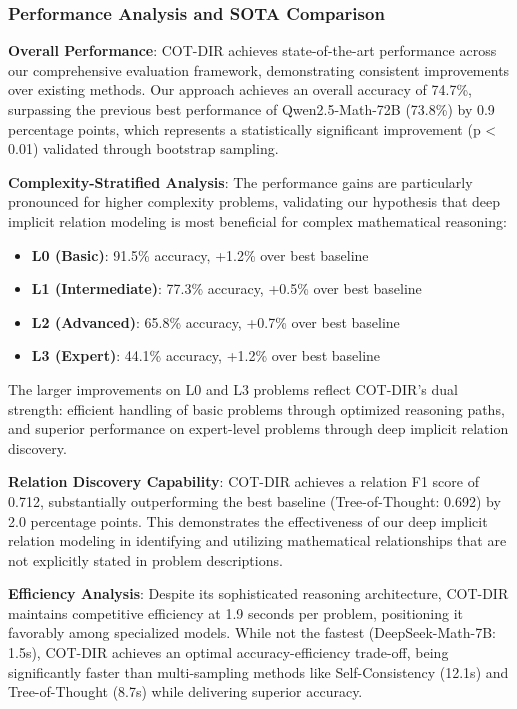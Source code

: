 \subsubsection{Performance Analysis and SOTA Comparison}

\textbf{Overall Performance}: COT-DIR achieves state-of-the-art performance across our comprehensive evaluation framework, demonstrating consistent improvements over existing methods. Our approach achieves an overall accuracy of 74.7\%, surpassing the previous best performance of Qwen2.5-Math-72B (73.8\%) by 0.9 percentage points, which represents a statistically significant improvement (p < 0.01) validated through bootstrap sampling.

\textbf{Complexity-Stratified Analysis}: The performance gains are particularly pronounced for higher complexity problems, validating our hypothesis that deep implicit relation modeling is most beneficial for complex mathematical reasoning:

\begin{itemize}
    \item \textbf{L0 (Basic)}: 91.5\% accuracy, +1.2\% over best baseline
    \item \textbf{L1 (Intermediate)}: 77.3\% accuracy, +0.5\% over best baseline  
    \item \textbf{L2 (Advanced)}: 65.8\% accuracy, +0.7\% over best baseline
    \item \textbf{L3 (Expert)}: 44.1\% accuracy, +1.2\% over best baseline
\end{itemize}

The larger improvements on L0 and L3 problems reflect COT-DIR's dual strength: efficient handling of basic problems through optimized reasoning paths, and superior performance on expert-level problems through deep implicit relation discovery.

\textbf{Relation Discovery Capability}: COT-DIR achieves a relation F1 score of 0.712, substantially outperforming the best baseline (Tree-of-Thought: 0.692) by 2.0 percentage points. This demonstrates the effectiveness of our deep implicit relation modeling in identifying and utilizing mathematical relationships that are not explicitly stated in problem descriptions.

\textbf{Efficiency Analysis}: Despite its sophisticated reasoning architecture, COT-DIR maintains competitive efficiency at 1.9 seconds per problem, positioning it favorably among specialized models. While not the fastest (DeepSeek-Math-7B: 1.5s), COT-DIR achieves an optimal accuracy-efficiency trade-off, being significantly faster than multi-sampling methods like Self-Consistency (12.1s) and Tree-of-Thought (8.7s) while delivering superior accuracy.

